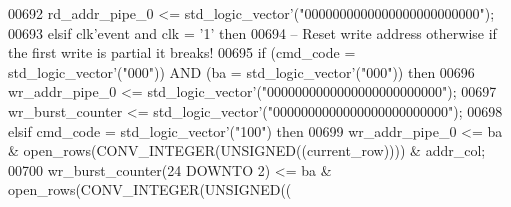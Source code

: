\begin{DoxyCode}
00692       \textcolor{vhdlchar}{rd_addr_pipe_0} \textcolor{vhdlchar}{<=} \textcolor{comment}{std\_logic\_vector}\textcolor{vhdlchar}{'}\textcolor{vhdlchar}{(}\textcolor{vhdllogic}{"0000000000000000000000000"}\textcolor{vhdlchar}{)};
00693     \textcolor{keywordflow}{elsif} \textcolor{vhdlchar}{clk}\textcolor{vhdlchar}{'}\textcolor{vhdlkeyword}{event} \textcolor{keywordflow}{and} \textcolor{vhdlchar}{clk} \textcolor{vhdlchar}{=} \textcolor{vhdlchar}{'}\textcolor{vhdllogic}{}\textcolor{vhdllogic}{1}\textcolor{vhdlchar}{'} \textcolor{keywordflow}{then}
00694 \textcolor{keyword}{      -- Reset write address otherwise if the first write is partial it breaks!}
00695       \textcolor{keywordflow}{if} \textcolor{vhdlchar}{(}\textcolor{vhdlchar}{cmd_code} \textcolor{vhdlchar}{=} \textcolor{comment}{std\_logic\_vector}\textcolor{vhdlchar}{'}\textcolor{vhdlchar}{(}\textcolor{vhdllogic}{"000"}\textcolor{vhdlchar}{)}\textcolor{vhdlchar}{)} \textcolor{keywordflow}{AND} \textcolor{vhdlchar}{(}\textcolor{vhdlchar}{ba} \textcolor{vhdlchar}{=} \textcolor{comment}{std\_logic\_vector}\textcolor{vhdlchar}{'}\textcolor{vhdlchar}{(}\textcolor{vhdllogic}{"000"}\textcolor{vhdlchar}{)}\textcolor{vhdlchar}{)} \textcolor{keywordflow}{then} 
00696         \textcolor{vhdlchar}{wr_addr_pipe_0} \textcolor{vhdlchar}{<=} \textcolor{comment}{std\_logic\_vector}\textcolor{vhdlchar}{'}\textcolor{vhdlchar}{(}\textcolor{vhdllogic}{"0000000000000000000000000"}\textcolor{vhdlchar}{)};
00697         \textcolor{vhdlchar}{wr_burst_counter} \textcolor{vhdlchar}{<=} \textcolor{comment}{std\_logic\_vector}\textcolor{vhdlchar}{'}\textcolor{vhdlchar}{(}\textcolor{vhdllogic}{"0000000000000000000000000"}\textcolor{vhdlchar}{)};
00698       \textcolor{keywordflow}{elsif} \textcolor{vhdlchar}{cmd_code} \textcolor{vhdlchar}{=} \textcolor{comment}{std\_logic\_vector}\textcolor{vhdlchar}{'}\textcolor{vhdlchar}{(}\textcolor{vhdllogic}{"100"}\textcolor{vhdlchar}{)} \textcolor{keywordflow}{then} 
00699         \textcolor{vhdlchar}{wr_addr_pipe_0} \textcolor{vhdlchar}{<=} \textcolor{vhdlchar}{ba} \textcolor{vhdlchar}{&} \textcolor{vhdlchar}{open_rows}\textcolor{vhdlchar}{(}\textcolor{vhdlchar}{CONV\_INTEGER}\textcolor{vhdlchar}{(}\textcolor{comment}{UNSIGNED}\textcolor{vhdlchar}{(}\textcolor{vhdlchar}{(}\textcolor{vhdlchar}{current_row}\textcolor{vhdlchar}{)}\textcolor{vhdlchar}{)}\textcolor{vhdlchar}{)}\textcolor{vhdlchar}{)} \textcolor{vhdlchar}{&} \textcolor{vhdlchar}{
      addr_col};
00700         \textcolor{vhdlchar}{wr_burst_counter}\textcolor{vhdlchar}{(}\textcolor{vhdllogic}{}\textcolor{vhdllogic}{24} \textcolor{keywordflow}{DOWNTO} \textcolor{vhdllogic}{}\textcolor{vhdllogic}{2}\textcolor{vhdlchar}{)} \textcolor{vhdlchar}{<=} \textcolor{vhdlchar}{ba} \textcolor{vhdlchar}{&} \textcolor{vhdlchar}{open_rows}\textcolor{vhdlchar}{(}\textcolor{vhdlchar}{CONV\_INTEGER}\textcolor{vhdlchar}{(}\textcolor{comment}{UNSIGNED}\textcolor{vhdlchar}{(}\textcolor{vhdlchar}{(}\textcolor{vhdlchar}{
}
\end{DoxyCode}
